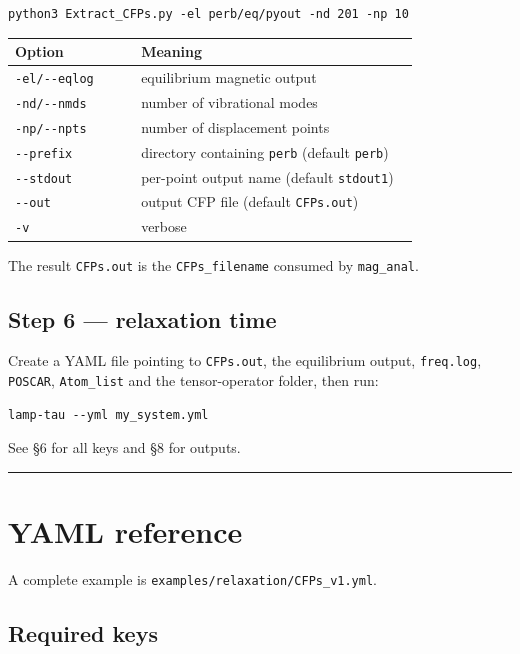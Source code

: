 \documentclass[11pt,a4paper]{article}
\begin{document}
\begin{lstlisting}
python3 Extract_CFPs.py -el perb/eq/pyout -nd 201 -np 10
\end{lstlisting}

\begin{longtable}[]{@{}>{\raggedright\arraybackslash}p{0.30\linewidth} >{\raggedright\arraybackslash}p{0.66\linewidth}@{}}
\toprule
Option & Meaning\tabularnewline
\midrule
\endhead
\texttt{-el/-\/-eqlog} & equilibrium magnetic output\tabularnewline
\texttt{-nd/-\/-nmds} & number of vibrational modes\tabularnewline
\texttt{-np/-\/-npts} & number of displacement points\tabularnewline
\texttt{-\/-prefix} & directory containing \texttt{perb} (default
\texttt{perb})\tabularnewline
\texttt{-\/-stdout} & per-point output name (default
\texttt{stdout1})\tabularnewline
\texttt{-\/-out} & output CFP file (default
\texttt{CFPs.out})\tabularnewline
\texttt{-v} & verbose\tabularnewline
\bottomrule
\end{longtable}

The result \texttt{CFPs.out} is the \texttt{CFPs\_filename} consumed by
\texttt{mag\_anal}.

\subsection{Step 6 --- relaxation
time}\label{step-6-relaxation-time}

Create a YAML file pointing to \texttt{CFPs.out}, the equilibrium
output, \texttt{freq.log}, \texttt{POSCAR}, \texttt{Atom\_list} and the
tensor-operator folder, then run:

\begin{lstlisting}
lamp-tau --yml my_system.yml
\end{lstlisting}

See \S6 for all keys and \S8 for outputs.

\begin{center}\rule{0.5\linewidth}{0.4pt}\end{center}

\section{YAML reference}\label{yaml-reference}

A complete example is \texttt{examples/relaxation/CFPs\_v1.yml}.

\subsection{Required keys}\label{required-keys}
\end{document}
